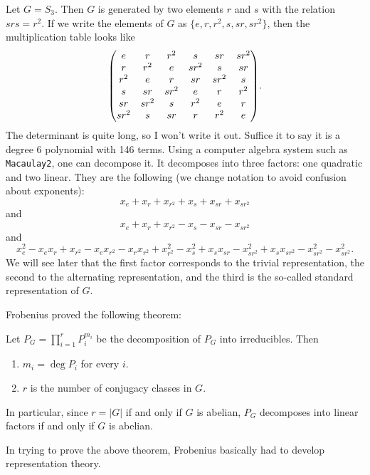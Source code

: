 \documentclass[11pt, english]{article}
\begin{document}
\begin{example}
Let $G=S_3$. Then $G$ is generated by two elements $r$ and $s$ with the relation $srs=r^2$. If we write the elements of $G$ as $\{e,r,r^2,s,sr,sr^2\}$, then the multiplication table looks like
 $$ \bgroup\begin{pmatrix}
e&     r&     r^2&     s&     sr&     sr^2\\
     r&    r^2&     e&    sr^2&     s&     sr\\ 
    r^2&     e&     r&     sr&     sr^2&     s\\ 
    s&     sr&    sr^2&     e&     r&    r^2\\ 
    sr&     sr^2&     s&    r^2&    e&     r\\
  sr^2&     s&   sr&     r&    r^2&     e\\
     \end{pmatrix}\egroup.$$
The determinant is quite long, so I won't write it out. Suffice it to say it is a degree $6$ polynomial with 146 terms. Using a computer algebra system such as \verb|Macaulay2|, one can decompose it. It decomposes into three factors: one quadratic and two linear. They are the following (we change notation to avoid confusion about exponents):
\[
x_e+x_r+x_{r^2}+x_s+x_{sr}+x_{sr^2}
\]
and 
\[
x_e+x_r+x_{r^2}-x_s-x_{sr}-x_{sr^2}
\]
and 
\[
x_e^2-x_ex_r+x_{r^2}-x_e x_{r^2}-x_r x_{r^2} + x_{r^2}^2-x_s^2+x_s x_{sr} - x_{sr^2}^2 + x_s x_{sr^2}-x_{sr^2}^2-x_{sr^2}^2.
\]
We will see later that the first factor corresponds to the trivial representation, the second to the alternating representation, and the third is the so-called standard representation of $G$.
\end{example}

Frobenius proved the following theorem:
\begin{thm}
  Let $P_G= \prod_{i=1}^r P_i^{m_i}$ be the decomposition of $P_G$ into irreducibles. Then
  \begin{enumerate}
  \item $m_i=\deg P_i$ for every $i$.
\item $r$ is the number of conjugacy classes in $G$. 
  \end{enumerate}
In particular, since $r=\lvert G \rvert $ if and only if $G$ is abelian, $P_G$ decomposes into linear factors if and only if $G$ is abelian.
\end{thm}

In trying to prove the above theorem, Frobenius basically  had to develop representation theory.
\end{document}
